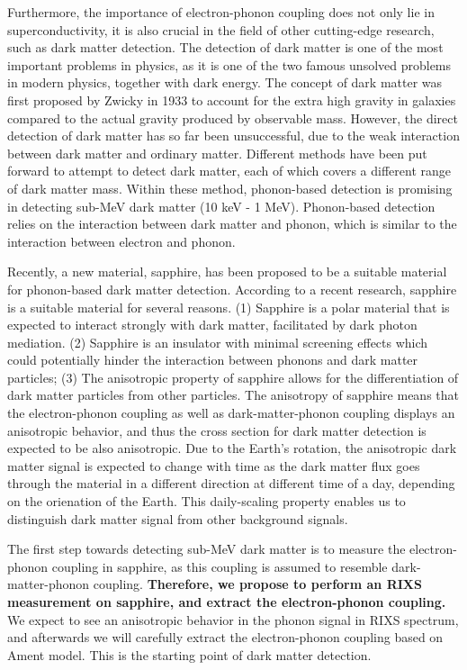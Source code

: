 \documentclass[11pt]{article}
\begin{document}
Furthermore, the importance of electron-phonon coupling does not only lie in superconductivity, it is also crucial in the field of other cutting-edge research, such as dark matter detection. The detection of dark matter is one of the most important problems in physics, as it is one of the two famous unsolved problems in modern physics, together with dark energy. The concept of dark matter was first proposed by Zwicky in 1933 to account for the extra high gravity in galaxies compared to the actual gravity produced by observable mass. However, the direct detection of dark matter has so far been unsuccessful, due to the weak interaction between dark matter and ordinary matter. Different methods have been put forward to attempt to detect dark matter\cite{}, each of which covers a different range of dark matter mass. Within these method, phonon-based detection is promising in detecting sub-MeV dark matter (10 keV - 1 MeV)\cite{}. Phonon-based detection relies on the interaction between dark matter and phonon, which is similar to the interaction between electron and phonon\cite{}. 

Recently, a new material, sapphire, has been proposed to be a suitable material for phonon-based dark matter detection\cite{}. According to a recent research, sapphire is a suitable material for several reasons. (1) Sapphire is a polar material that is expected to interact strongly with dark matter, facilitated by dark photon mediation. (2) Sapphire is an insulator with minimal screening effects which could potentially hinder the interaction between phonons and dark matter particles; (3)  The anisotropic property of sapphire allows for the differentiation of dark matter particles from other particles. The anisotropy of sapphire means that the electron-phonon coupling as well as dark-matter-phonon coupling displays an anisotropic behavior\cite{}, and thus the cross section for dark matter detection is expected to be also anisotropic. Due to the Earth's rotation, the anisotropic dark matter signal is expected to change with time as the dark matter flux goes through the material in a different direction at different time of a day, depending on the orienation of the Earth. This daily-scaling property enables us to distinguish dark matter signal from other background signals. 

The first step towards detecting sub-MeV dark matter is to measure the electron-phonon coupling in sapphire, as this coupling is assumed to resemble dark-matter-phonon coupling. \textbf{Therefore, we propose to perform an RIXS measurement on sapphire, and extract the electron-phonon coupling.}  We expect to see an anisotropic behavior in the phonon signal in RIXS spectrum, and afterwards we will carefully extract the electron-phonon coupling based on Ament model\cite{ament_determining_2011}. This is the starting point of dark matter detection.
\end{document}
